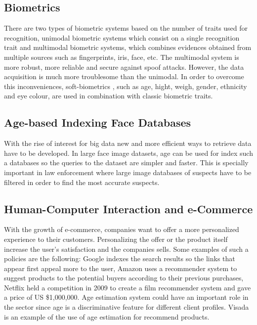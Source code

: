 \subsection{Biometrics}
There are two types of biometric systems based on the number of traits used for recognition, unimodal biometric systems which consist on a single recognition trait and multimodal biometric systems, which combines evidences obtained from multiple sources \cite{MSU-CSE-99-39} such as fingerprints, iris, face, etc. The multimodal system is more robust, more reliable and secure against spoof attacks. However, the data acquisition is much more troublesome than the unimodal. In order to overcome this inconveniences, soft-biometrics \cite{conf/icba/JainDN04}, such as age, hight, weigh, gender, ethnicity and eye colour, are used in combination with classic biometric traits. 

\subsection{Age-based Indexing Face Databases}
With the rise of interest for big data new and more efficient ways to retrieve data have to be developed. In large face image datasets, age can be used for index such a databases so the queries to the dataset are simpler and faster. This is specially important in law enforcement where large image databases of suspects have to be filtered in order to find the most accurate suspects.

\subsection{Human-Computer Interaction and e-Commerce}
With the growth of e-commerce, companies want to offer a more personalized experience to their customers. Personalizing the offer or the product itself increase the user's satisfaction and the companies sells. Some examples of such a policies are the following: Google \cite{Brin:1998:ALH:297810.297827} indexes the search results so the links that appear first appeal more to the user, Amazon \cite{Linden:2003:ARI:642462.642471} uses a recommender system to suggest products to the potential buyers according to their previous purchases, Netflix \cite{Koren:2009:MFT:1608565.1608614} held a competition in 2009 to create a film recommender system and gave a price of US \$1,000,000. Age estimation system could have an important role in the sector since age is a discriminative feature for different client profiles. Visada \cite{visada} is an example of the use of age estimation for recommend products.


